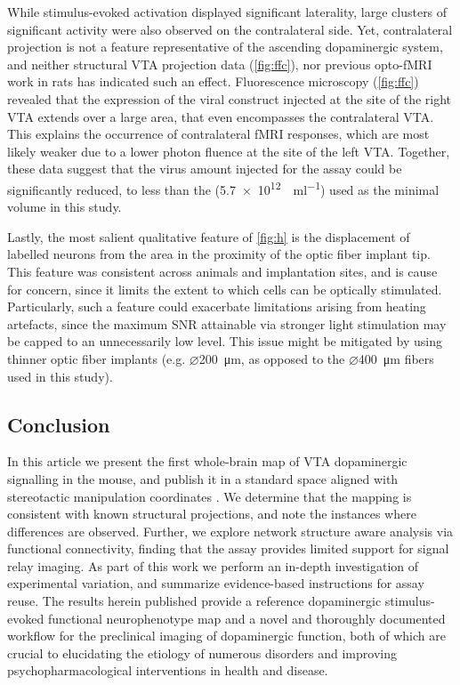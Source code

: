 While stimulus-evoked activation displayed significant laterality, large clusters of significant activity were also observed on the contralateral side.
Yet, contralateral projection is not a feature representative of the ascending dopaminergic system, and neither structural VTA projection data (\cref{fig:ffc}), nor previous opto-fMRI work in rats \cite{Lohani2016} has indicated such an effect.
Fluorescence microscopy (\cref{fig:ffc}) revealed that the expression of the viral construct injected at the site of the right VTA extends over a large area, that even encompasses the contralateral VTA.
This explains the occurrence of contralateral fMRI responses, which are most likely weaker due to a lower photon fluence at the site of the left VTA.
Together, these data suggest that the virus amount injected for the assay could be significantly reduced, to less than the
(\SI{5.7e12}{\vg\per\milli\litre})
used as the minimal volume in this study.

Lastly, the most salient qualitative feature of \cref{fig:h} is the displacement of labelled neurons from the area in the proximity of the optic fiber implant tip.
This feature was consistent across animals and implantation sites, and is cause for concern, since it limits the extent to which cells can be optically stimulated.
Particularly, such a feature could exacerbate limitations arising from heating artefacts, since the maximum SNR attainable via stronger light stimulation may be capped to an unnecessarily low level.
This issue might be mitigated by using thinner optic fiber implants (e.g. $\diameter$\SI{200}{\micro\meter}, as opposed to the $\diameter$\SI{400}{\micro\meter} fibers used in this study).

\subsection{Conclusion}

In this article we present the first whole-brain map of VTA dopaminergic signalling in the mouse, and publish it in a standard space aligned with stereotactic manipulation coordinates \cite{me}.
We determine that the mapping is consistent with known structural projections, and note the instances where differences are observed.
Further, we explore network structure aware analysis via functional connectivity, finding that the assay provides limited support for signal relay imaging.
As part of this work we perform an in-depth investigation of experimental variation, and summarize evidence-based instructions for assay reuse.
The results herein published provide a reference dopaminergic stimulus-evoked functional neurophenotype map and a novel and thoroughly documented workflow for the preclinical imaging of dopaminergic function, both of which are crucial to elucidating the etiology of numerous disorders and improving psychopharmacological interventions in health and disease.
